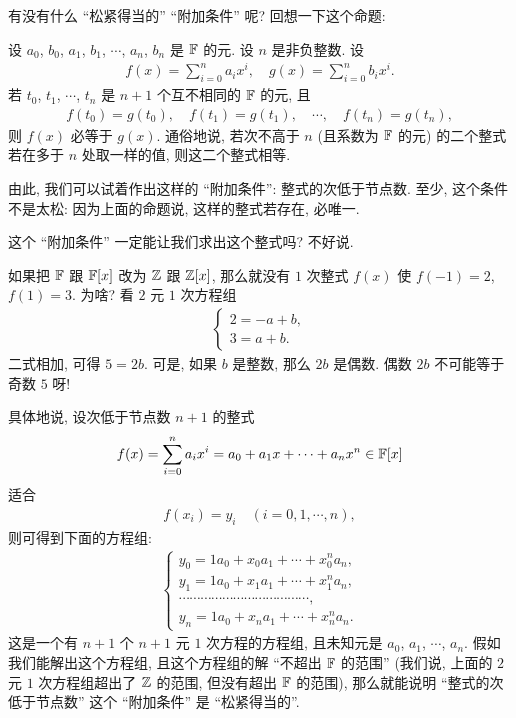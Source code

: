 有没有什么 ``松紧得当的'' ``附加条件'' 呢? 回想一下这个命题:

\begin{proposition}
    设 $a_0$, $b_0$, $a_1$, $b_1$, $\cdots$, $a_n$, $b_n$ 是 $\mathbb{F}$ 的元. 设 $n$ 是非负整数. 设
    \begin{align*}
        f(x) = \sum_{i = 0}^n a_i x^i, \quad g(x) = \sum_{i = 0}^n b_i x^i.
    \end{align*}
    若 $t_0$, $t_1$, $\cdots$, $t_n$ 是 $n+1$ 个互不相同的 $\mathbb{F}$ 的元, 且
    \begin{align*}
        f(t_0) = g(t_0), \quad f(t_1) = g(t_1), \quad \cdots, \quad f(t_n) = g(t_n),
    \end{align*}
    则 $f(x)$ 必等于 $g(x)$. 通俗地说, 若次不高于 $n$ (且系数为 $\mathbb{F}$ 的元) 的二个整式若在多于 $n$ 处取一样的值, 则这二个整式相等.
\end{proposition}

由此, 我们可以试着作出这样的 ``附加条件'': 整式的次低于节点数. 至少, 这个条件不是太松: 因为上面的命题说, 这样的整式若存在, 必唯一.

这个 ``附加条件'' 一定能让我们求出这个整式吗? 不好说.

\begin{example}
    如果把 $\mathbb{F}$ 跟 $\mathbb{F}[x]$ 改为 $\mathbb{Z}$ 跟 $\mathbb{Z}[x]$, 那么就没有 $1$ 次整式 $f(x)$ 使 $f(-1)=2$, $f(1)=3$. 为啥? 看 $2$ 元 $1$ 次方程组
    \begin{align*}
        \begin{cases}
            2 = -a + b, \\
            3 = a + b.
        \end{cases}
    \end{align*}
    二式相加, 可得 $5 = 2b$. 可是, 如果 $b$ 是整数, 那么 $2b$ 是偶数. 偶数 $2b$ 不可能等于奇数 $5$ 呀!
\end{example}

具体地说, 设次低于节点数 $n+1$ 的整式
\begin{align*}
    f(x) = \sum_{i=0}^n a_i x^i = a_0 + a_1 x + \cdots + a_n x^n \in \mathbb{F}[x]
\end{align*}
适合
\begin{align*}
    f(x_i) = y_i \quad (i = 0,1,\cdots,n),
\end{align*}
则可得到下面的方程组:
\begin{align*}
    \begin{cases}
        y_0 = 1 a_0 + x_0 a_1 + \cdots + x_0^n a_n, \\
        y_1 = 1 a_0 + x_1 a_1 + \cdots + x_1^n a_n, \\
        \cdots \cdots \cdots \cdots \cdots \cdots \cdots \cdots
        \cdots \cdots \cdots \cdots,                \\
        y_n = 1 a_0 + x_n a_1 + \cdots + x_n^n a_n.
    \end{cases}
\end{align*}
这是一个有 $n+1$ 个 $n+1$ 元 $1$ 次方程的方程组, 且未知元是 $a_0$, $a_1$, $\cdots$, $a_n$. 假如我们能解出这个方程组, 且这个方程组的解 ``不超出 $\mathbb{F}$ 的范围'' (我们说, 上面的 $2$ 元 $1$ 次方程组超出了 $\mathbb{Z}$ 的范围, 但没有超出 $\mathbb{F}$ 的范围), 那么就能说明 ``整式的次低于节点数'' 这个 ``附加条件'' 是 ``松紧得当的''.

